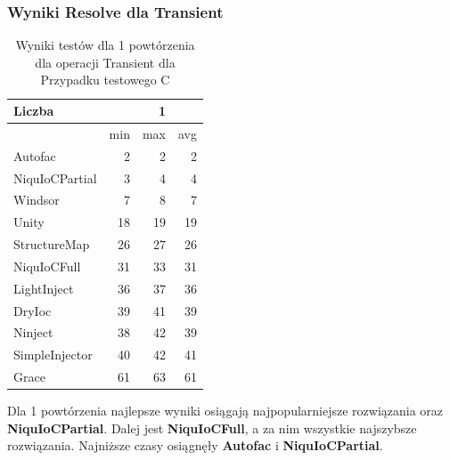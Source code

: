 \documentclass[12pt]{article}
\begin{document}
\subsubsection{Wyniki Resolve dla Transient}
\begin{table}[H]
\captionsetup{belowskip=0pt,aboveskip=0pt}
\begin{center}
\begin{small}
	\begin{tabular}{ | l | r r r | }
    		\hline
Liczba & & 1 & \\ \hline
 & min & max & avg \\ \hline
Autofac & 2 & 2 & 2 \\ \hline
NiquIoCPartial & 3 & 4 & 4 \\ \hline
Windsor & 7 & 8 & 7 \\ \hline
Unity & 18 & 19 & 19 \\ \hline
StructureMap & 26 & 27 & 26 \\ \hline
NiquIoCFull & 31 & 33 & 31 \\ \hline
LightInject & 36 & 37 & 36 \\ \hline
DryIoc & 39 & 41 & 39 \\ \hline
Ninject & 38 & 42 & 39 \\ \hline
SimpleInjector & 40 & 42 & 41 \\ \hline
Grace & 61 & 63 & 61 \\ \hline
  	\end{tabular}
\end{small}
\end{center}
\caption{Wyniki testów dla 1 powtórzenia dla operacji Transient dla Przypadku testowego C}
\label{TestCaseC_Transient1}
\end{table}
Dla 1 powtórzenia najlepsze wyniki osiągają najpopularniejsze rozwiązania oraz \textbf{NiquIoCPartial}. Dalej jest \textbf{NiquIoCFull}, a za nim wszystkie najszybsze rozwiązania. Najniższe czasy osiągnęły \textbf{Autofac} i \textbf{NiquIoCPartial}.
\\ \\
\end{document}
